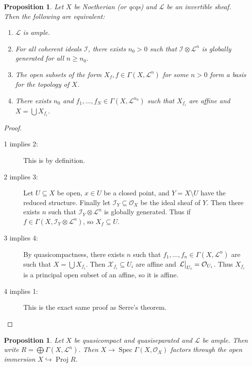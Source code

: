 \documentclass[leqno, openany]{memoir}
\newtheorem{prop}[thm]{Proposition}
\theoremstyle{definition}
\theoremstyle{remark}
\theoremstyle{plain}
\theoremstyle{definition}
\theoremstyle{remark}
\newcommand{\mc}[1]{\mathcal{#1}}
\DeclareMathOperator{\Spec}{Spec}
\DeclareMathOperator{\Proj}{Proj}
\begin{document}
\begin{prop} Let $X$ be Noetherian (or qcqs) and $\mc{L}$ be an invertible
    sheaf. Then the following are equivalent: \begin{enumerate} \item $\mc{L}$
        is ample.  \item For all coherent ideals $\mc{I}$, there exists $n_0 >
        0$ such that $\mc{I} \otimes \mc{L}^n$ is globally generated for all $n
        \geq n_0$.  \item The open subsets of the form $X_f, f \in \Gamma(X,
        \mc{L}^n)$ for some $n > 0$ form a basis for the topology of $X$.
    \item There exists $n_0$ and $f_1, \ldots, f_N \in \Gamma(X, \mc{L}^{n_0})$
        such that $X_{f_i}$ are affine and $X = \bigcup X_{f_i}$.
\end{enumerate} \end{prop}

\begin{proof}\leavevmode \begin{description} \item[1 implies 2:] This is by
    definition.  \item[2 implies 3:] Let $U \subseteq X$ be open, $x \in U$ be
    a closed point, and $Y = X \setminus U$ have the reduced structure. Finally
    let $\mc{I}_Y \subseteq \mc{O}_X$ be the ideal sheaf of $Y$. Then there
    exists $n$ such that $\mc{I}_Y \otimes \mc{L}^n$ is globally generated.
    Thus if $f \in \Gamma(X, \mc{I}_Y \otimes \mc{L}^n)$, so $X_f \subseteq U$.
\item[3 implies 4:] By quasicompactness, there exists $n$ such that $f_1,
    \ldots, f_n \in \Gamma(X, \mc{L}^n)$ are such that $X = \bigcup X_{f_i}$.
    Then $\mc{X}_{f_i} \subseteq U_i$ are affine and $\eval{\mc{L}}_{U_i} =
    \mc{O}_{U_i}$. Thus $X_{f_i}$ is a principal open subset of an affine, so
    it is affine.  \item[4 implies 1:] This is the exact same proof as Serre's
    theorem. \qedhere \end{description} \end{proof}

\begin{prop} Let $X$ be quasicompact and quasiseparated and $\mc{L}$ be ample.
Then write $R = \bigoplus \Gamma(X, \mc{L}^n)$. Then $X \to \Spec \Gamma(X,
\mc{O}_X)$ factors through the open immersion $X \hookrightarrow \Proj R$.
\end{prop}
\end{document}
